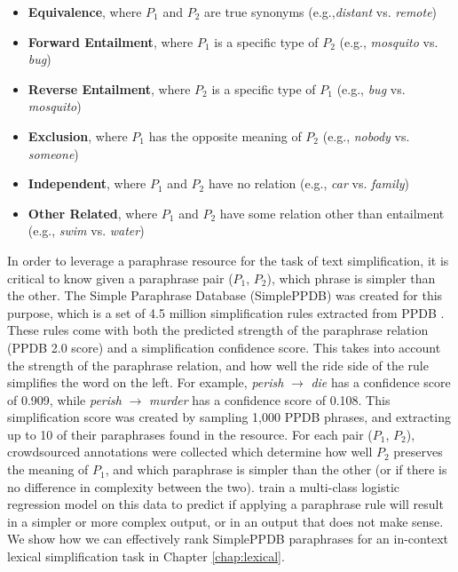 \documentclass[thesis.tex]{subfiles}
\begin{document}
\begin{itemize}
\item \textbf{Equivalence}, where $P_1$ and $P_2$ are true synonyms (e.g.,\textit{distant} vs. \textit{remote})
\item \textbf{Forward Entailment}, where $P_1$ is a specific type of $P_2$ (e.g., \textit{mosquito} vs.  \textit{bug})
\item \textbf{Reverse Entailment}, where $P_2$ is a specific type of $P_1$ (e.g., \textit{bug} vs.  \textit{mosquito})
\item \textbf{Exclusion}, where $P_1$ has the opposite meaning of $P_2$ (e.g., \textit{nobody} vs.  \textit{someone})
\item \textbf{Independent}, where $P_1$ and $P_2$ have no relation (e.g., \textit{car} vs. \textit{family})
\item \textbf{Other Related}, where $P_1$ and $P_2$ have some relation other than entailment (e.g., \textit{swim} vs. \textit{water})
\end{itemize}

In order to leverage a paraphrase resource for the task of text simplification, it is critical to know given a paraphrase pair ($P_1$, $P_2$), which phrase is simpler than the other. The Simple Paraphrase Database (SimplePPDB) was created for this purpose, which is a set of 4.5 million simplification rules extracted from PPDB \citep{pavlick2016simple}. These rules come with both the predicted strength of the paraphrase relation (PPDB 2.0 score) and a simplification confidence score. This takes into account the strength of the paraphrase relation, and how well the ride side of the rule simplifies the word on the left. For example, \textit{perish} $\rightarrow$ \textit{die} has a confidence score of 0.909, while \textit{perish} $\rightarrow$ \textit{murder} has a confidence score of 0.108. This simplification score was created by sampling 1,000 PPDB phrases, and extracting up to 10 of their paraphrases found in the resource. For each pair ($P_1$, $P_2$), crowdsourced annotations were collected which determine how well $P_2$ preserves the meaning of $P_1$, and which paraphrase is simpler than the other (or if there is no difference in complexity between the two). \cite{pavlick2016simple} train a multi-class logistic regression model on this data to predict if applying a paraphrase rule will result in a simpler or more complex output, or in an output that does not make sense. We show how we can effectively rank SimplePPDB paraphrases for an in-context lexical simplification task in Chapter \ref{chap:lexical}.
\end{document}
